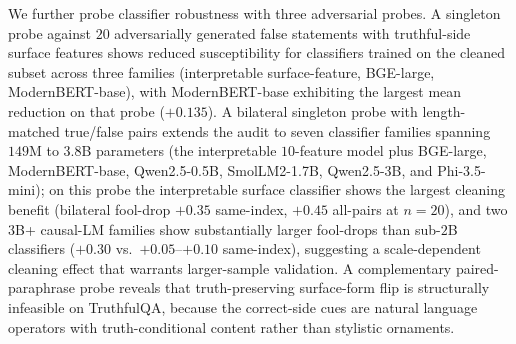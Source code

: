 %
%



We further probe classifier robustness with three adversarial probes.
A singleton probe against $20$ adversarially generated false
statements with truthful-side surface features shows reduced
susceptibility for classifiers trained on the cleaned subset across
three families (interpretable surface-feature, BGE-large,
ModernBERT-base), with ModernBERT-base exhibiting the largest mean
reduction on that probe ($+0.135$). A bilateral singleton probe with
length-matched true/false pairs extends the audit to seven classifier
families spanning $149$M to $3.8$B parameters (the interpretable
$10$-feature model plus BGE-large, ModernBERT-base, Qwen2.5-0.5B,
SmolLM2-1.7B, Qwen2.5-3B, and Phi-3.5-mini); on this probe the
interpretable surface classifier shows the largest cleaning benefit
(bilateral fool-drop $+0.35$ same-index, $+0.45$ all-pairs at $n=20$),
and two $3$B+ causal-LM families show substantially larger fool-drops
than sub-$2$B classifiers ($+0.30$ vs.\ $+0.05$--$+0.10$ same-index),
suggesting a scale-dependent cleaning effect that warrants
larger-sample validation. A complementary paired-paraphrase probe
reveals that truth-preserving surface-form flip is structurally
infeasible on TruthfulQA, because the correct-side cues are natural
language operators with truth-conditional content rather than
stylistic ornaments.


